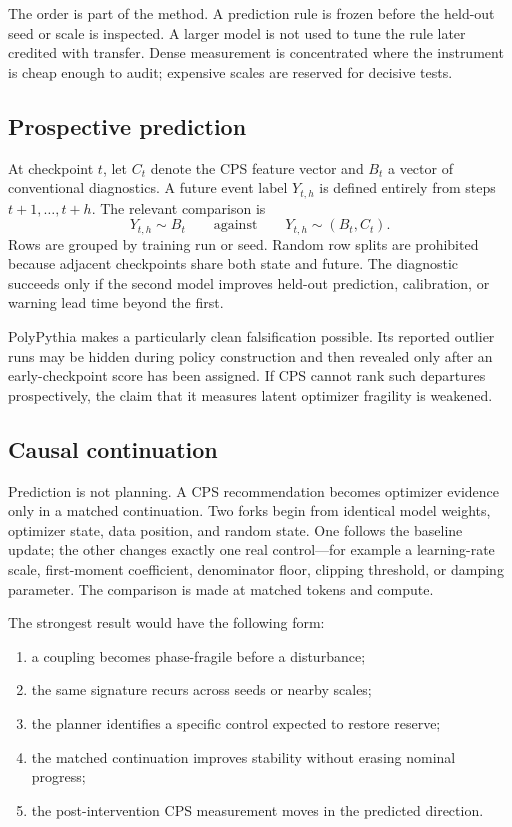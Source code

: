 The order is part of the method.  A prediction rule is frozen before the held-out seed or scale is inspected.  A larger model is not used to tune the rule later credited with transfer.  Dense measurement is concentrated where the instrument is cheap enough to audit; expensive scales are reserved for decisive tests.

\subsection{Prospective prediction}

At checkpoint \(t\), let \(C_t\) denote the CPS feature vector and \(B_t\) a vector of conventional diagnostics.  A future event label \(Y_{t,h}\) is defined entirely from steps \(t+1,\ldots,t+h\).  The relevant comparison is
\[
Y_{t,h}\sim B_t
\qquad\text{against}\qquad
Y_{t,h}\sim(B_t,C_t).
\]
Rows are grouped by training run or seed.  Random row splits are prohibited because adjacent checkpoints share both state and future.  The diagnostic succeeds only if the second model improves held-out prediction, calibration, or warning lead time beyond the first.

PolyPythia makes a particularly clean falsification possible.  Its reported outlier runs may be hidden during policy construction and then revealed only after an early-checkpoint score has been assigned.  If CPS cannot rank such departures prospectively, the claim that it measures latent optimizer fragility is weakened.

\subsection{Causal continuation}

Prediction is not planning.  A CPS recommendation becomes optimizer evidence only in a matched continuation.  Two forks begin from identical model weights, optimizer state, data position, and random state.  One follows the baseline update; the other changes exactly one real control---for example a learning-rate scale, first-moment coefficient, denominator floor, clipping threshold, or damping parameter.  The comparison is made at matched tokens and compute.

The strongest result would have the following form:
\begin{enumerate}[leftmargin=1.7em]
\item a coupling becomes phase-fragile before a disturbance;
\item the same signature recurs across seeds or nearby scales;
\item the planner identifies a specific control expected to restore reserve;
\item the matched continuation improves stability without erasing nominal progress;
\item the post-intervention CPS measurement moves in the predicted direction.
\end{enumerate}
